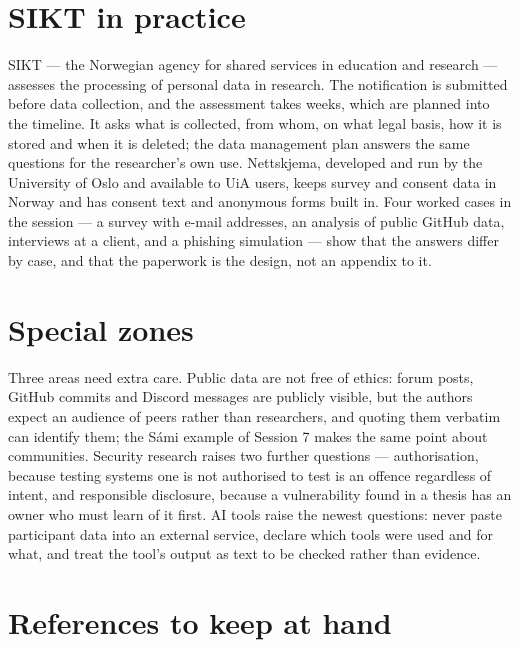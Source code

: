 \documentclass[11pt,a4paper,british,twoside=false,headings=small,chapterprefix=false,numbers=noenddot]{scrbook}
\begin{document}
\section{SIKT in practice}

SIKT --- the Norwegian agency for shared services in education and research --- assesses the processing of personal data in research. The notification is submitted before data collection, and the assessment takes weeks, which are planned into the timeline. It asks what is collected, from whom, on what legal basis, how it is stored and when it is deleted; the data management plan answers the same questions for the researcher's own use. Nettskjema, developed and run by the University of Oslo and available to UiA users, keeps survey and consent data in Norway and has consent text and anonymous forms built in. Four worked cases in the session --- a survey with e-mail addresses, an analysis of public GitHub data, interviews at a client, and a phishing simulation --- show that the answers differ by case, and that the paperwork is the design, not an appendix to it.

\section{Special zones}

Three areas need extra care. Public data are not free of ethics: forum posts, GitHub commits and Discord messages are publicly visible, but the authors expect an audience of peers rather than researchers, and quoting them verbatim can identify them; the Sámi example of Session 7 makes the same point about communities. Security research raises two further questions --- authorisation, because testing systems one is not authorised to test is an offence regardless of intent, and responsible disclosure, because a vulnerability found in a thesis has an owner who must learn of it first. AI tools raise the newest questions: never paste participant data into an external service, declare which tools were used and for what, and treat the tool's output as text to be checked rather than evidence.

\section{References to keep at hand}
\end{document}

